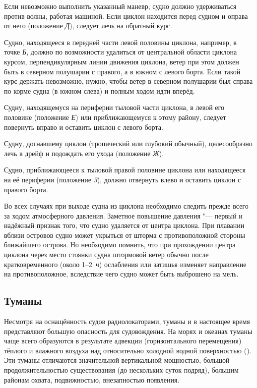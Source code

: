 Если невозможно выполнить указанный маневр, судно должно удерживаться
против волны, работая машиной. Если циклон находится перед судном и
оправа от него (положение \textit{Д}), следует лечь на обратный курс.

Судно, находящееся в передней части левой половины циклона, например,
в точке \textit{Б}, должно по возможности удалиться от центральной области
циклона курсом, перпендикулярным линии движения циклона, ветер при
этом должен быть в северном полушарии с правого, а в южном с левого
борта. Если такой курс держать невозможно, нужно, чтобы ветер в
северном полушарии был справа по корме судна (в южном слева) и полным
ходом идти вперёд.

Судну, находящемуся на периферии тыловой части циклона, в левой его
половине (положение \textit{Е}) или приближающемуся к этому району, следует
повернуть вправо и оставить циклон с левого борта.

Судну, догнавшему циклон (тропический или глубокий обычный),
целесообразно лечь в дрейф и подождать его ухода (положение \textit{Ж}).

Судно, приближающееся к тыловой правой половине циклона или
находящееся на её периферии (положение \textit{3}), должно отвернуть влево и
оставить циклон с правого борта.

Во всех случаях при выходе судна из циклона необходимо следить прежде
всего за ходом атмосферного давления. Заметное повышение давления "---
первый и надёжный признак того, что судно удаляется от центра
циклона. При плавании вблизи островов судно может укрыться от шторма с
противоположной стороны ближайшего острова. Но необходимо помнить, что
при прохождении центра циклона через место стоянки судна штормовой
ветер обычно после кратковременного (около 1--2~ч) ослабления или
затишья изменяет направление на противоположное, вследствие чего
судно может быть выброшено на мель.

\subsection{Туманы}

Несмотря на оснащённость судов радиолокаторами, туманы и в настоящее
время представляют большую опасность для судовождения. На морях и
океанах туманы чаще всего образуются в результате адвекции
(горизонтального перемещения) тёплого и влажного воздуха над
относительно холодной водной поверхностью (). Эти туманы
отличаются значительной вертикальной мощностью, большой
продолжительностью существования (до нескольких суток подряд), большим
районам охвата, подвижностью, внезапностью появления.

